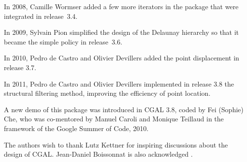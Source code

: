 In 2008, Camille Wormser added a few more iterators in
the package that were integrated in release~3.4.

In 2009, Sylvain Pion simplified the design of the Delaunay hierarchy
so that it became the simple  policy in release~3.6.

In 2010, Pedro de Castro and Olivier Devillers added the point
displacement in release 3.7.

In 2011,  Pedro de Castro and Olivier Devillers implemented in release
3.8 the
structural filtering method, improving the efficiency of point location.

A new demo of this package was introduced in CGAL 3.8, coded by Fei
(Sophie) Che, who was co-mentored by Manuel Caroli and Monique
Teillaud in the framework of the Google Summer of Code, 2010.

The authors wish to thank Lutz Kettner for inspiring discussions about
the design of CGAL. Jean-Daniel Boissonnat is also acknowledged
\cite{bdty-tcgal-00}.
